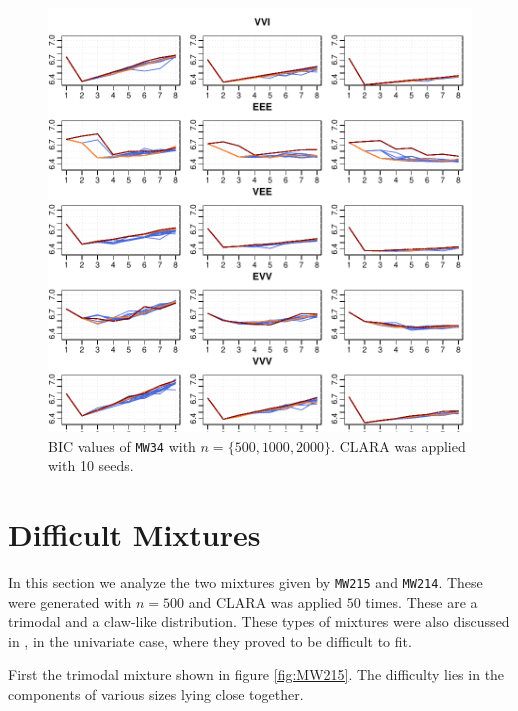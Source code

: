 \begin{figure}[h!]
    \begin{Rgraph}[0.9]
\includegraphics{chapter3-figmw34bicsecond}
    \caption{BIC values of {\tt MW34} with $n=\{500, 1000, 2000\}$. CLARA was 
             applied with 10 seeds.}
    \label{fig:bicmw34second}
    \end{Rgraph}
\end{figure}

\clearpage

\section{Difficult Mixtures}
\label{sec:dif}

In this section we analyze the two mixtures given by {\tt MW215} and {\tt MW214}.
These were generated with $n=500$ and CLARA was applied $50$ times.
These are a trimodal and a claw-like distribution. These types of mixtures were 
also discussed in \cite{Mar92}, in the univariate case, where they proved to be 
difficult to fit.

First the trimodal mixture shown in figure \ref{fig:MW215}. The difficulty 
lies in the components of various sizes lying close together.

